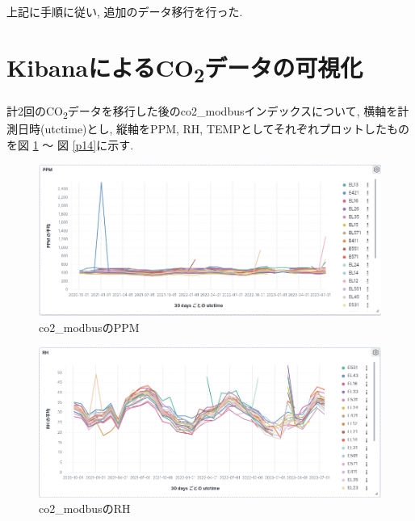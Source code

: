 上記に手順に従い, 追加のデータ移行を行った.

\section{KibanaによるCO\textsubscript{2}データの可視化}

計2回のCO\textsubscript{2}データを移行した後のco2\_modbusインデックスについて, 横軸を計測日時(utctime)とし, 縦軸をPPM, RH, TEMPとしてそれぞれプロットしたものを図 \ref{p12} 〜 図 \ref{p14}に示す.

\begin{figure}[h]
  \begin{center}
    \includegraphics[width=160mm]{sotu/figure/ppm.png}
    \caption{co2\_modbusのPPM}
    \label{p12}
  \end{center}
\end{figure}

\begin{figure}[h]
  \begin{center}
    \includegraphics[width=160mm]{sotu/figure/rh.png}
    \caption{co2\_modbusのRH}
    \label{p13}
  \end{center}
\end{figure}

